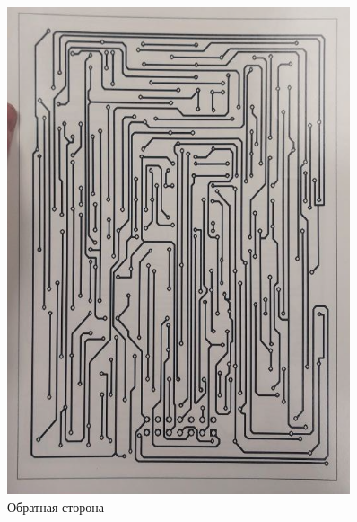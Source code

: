 \documentclass[a4paper, 12pt]{article}
\begin{document}
\begin{figure}[h!]
	\centering
	\includegraphics[width=0.9\textwidth]{docs/ex3.png}
	\caption{Обратная сторона}
\end{figure}
\end{document}
